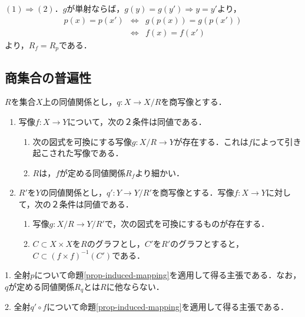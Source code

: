 \documentclass[uplatex,dvipdfmx]{jsreport}
\begin{document}
\begin{Proof}
\begin{description}
        $(1)\Rightarrow(2)$．$g$が単射ならば，$g(y)=g(y')\Rightarrow y=y'$より，
        \begin{eqnarray*}
            p(x)=p(x') &\Leftrightarrow& g(p(x))=g(p(x')) \\
            &\Leftrightarrow& f(x)=f(x')
        \end{eqnarray*}
        より，$R_f=R_p$である．
    \end{description}
\end{Proof}

\subsection{商集合の普遍性}

\begin{corollary}[商集合の普遍性]\label{cor-universality-of-quotient-set}
    $R$を集合$X$上の同値関係とし，$q:X\to X/R$を商写像とする．
    \begin{enumerate}
        \item 写像$f:X\to Y$について，次の２条件は同値である．
        \begin{enumerate}[(1)]
            \item 次の図式を可換にする写像$g:X/R\to Y$が存在する．これは$f$によって引き起こされた写像である．\begin{center}\end{center}
            \item $R$は，$f$が定める同値関係$R_f$より細かい．
        \end{enumerate}
        \item $R'$を$Y$の同値関係とし，$q':Y\to Y/R'$を商写像とする．写像$f:X\to Y$に対して，次の２条件は同値である．
        \begin{enumerate}[(1)]
            \item 写像$g:X/R\to Y/R'$で，次の図式を可換にするものが存在する．
            \begin{center}\end{center}
            \item $C\subset X\times X$を$R$のグラフとし，$C'$を$R'$のグラフとすると，$C\subset (f\times f)^{-1}(C')$である．
        \end{enumerate}
    \end{enumerate}
\end{corollary}
\begin{Proof}
    1. 全射$p$について命題\ref{prop-induced-mapping}を適用して得る主張である．なお，$q$が定める同値関係$R_q$とは$R$に他ならない．
    
    2. 全射$q'\circ f$について命題\ref{prop-induced-mapping}を適用して得る主張である．
\end{Proof}
\end{document}
